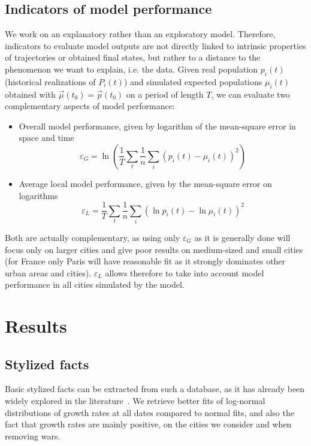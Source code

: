 \documentclass{article}
\begin{document}
\subsection*{Indicators of model performance}

We work on an explanatory rather than an exploratory model. Therefore, indicators to evaluate model outputs are not directly linked to intrinsic properties of trajectories or obtained final states, but rather to a distance to the phenomenon we want to explain, i.e. the data. Given real population $p_i(t)$ (historical realizations of $P_i(t)$) and simulated expected populations $\mu_i(t)$ obtained with $\vec{\mu}(t_0) = \vec{p}(t_0)$ on a period of length $T$, we can evaluate two complementary aspects of model performance:

\begin{itemize}
\item Overall model performance, given by logarithm of the mean-square error in space and time
\[
\varepsilon_G = \ln{\left(\frac{1}{T}\sum_t \frac{1}{n} \sum_i \left(p_i (t) - \mu_i (t) \right)^2\right)}
\]
\item Average local model performance, given by the mean-square error on logarithms
\[
\varepsilon_L = \frac{1}{T}\sum_t \frac{1}{n} \sum_i \left(\ln p_i(t) - \ln \mu_i (t)\right)^2
\]
\end{itemize}

Both are actually complementary, as using only $\varepsilon_G$ as it is generally done will focus only on larger cities and give poor results on medium-sized and small cities (for France only Paris will have reasonable fit as it strongly dominates other urban areas and cities). $\varepsilon_L$ allows therefore to take into account model performance in all cities simulated by the model.






\section*{Results}



\subsection*{Stylized facts}

Basic stylized facts can be extracted from such a database, as it has already been widely explored in the literature~\citep{guerin1990150}. We retrieve better fits of log-normal distributions of growth rates at all dates compared to normal fits, and also the fact that growth rates are mainly positive, on the cities we consider and when removing wars.
\end{document}
